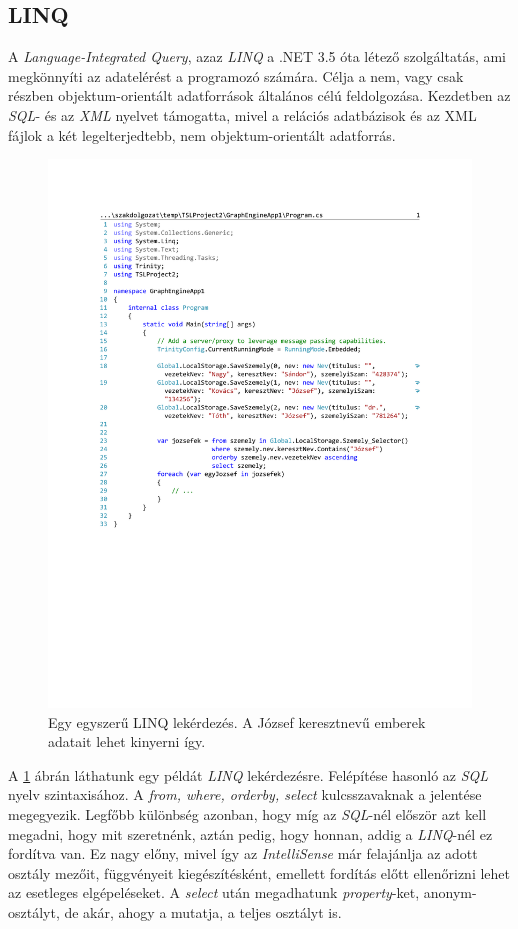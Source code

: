 \subsection{LINQ} \label{graphenginelinq}

A \emph{Language-Integrated Query}, azaz \emph{LINQ} a .NET 3.5 óta létező szolgáltatás, ami megkönnyíti az adatelérést a programozó számára. Célja a nem, vagy csak részben objektum-orientált adatforrások általános célú feldolgozása.\cite{LINQ} Kezdetben az \emph{SQL}- és az \emph{XML} nyelvet támogatta, mivel a relációs adatbázisok és az XML fájlok a két legelterjedtebb, nem objektum-orientált adatforrás.

\begin{figure}[H]
	\centering
	\includegraphics[]{figures/JozsefekLINQ.pdf}
	\caption{Egy egyszerű LINQ lekérdezés. A József keresztnevű emberek adatait lehet kinyerni így.}
	\label{fig:LINQ}
\end{figure}

A \ref{fig:LINQ} ábrán láthatunk egy példát \emph{LINQ} lekérdezésre. Felépítése hasonló az \emph{SQL} nyelv szintaxisához. A \emph{from, where, orderby, select} kulcsszavaknak a jelentése megegyezik. Legfőbb különbség azonban, hogy míg az \emph{SQL}-nél először azt kell megadni, hogy mit szeretnénk, aztán pedig, hogy honnan, addig a \emph{LINQ}-nél ez fordítva van. Ez nagy előny, mivel így az \emph{IntelliSense} már felajánlja az adott osztály mezőit, függvényeit kiegészítésként, emellett fordítás előtt ellenőrizni lehet az esetleges elgépeléseket. A \emph{select} után megadhatunk \emph{property}-ket, anonym-osztályt, de akár, ahogy a  mutatja, a teljes osztályt is.

